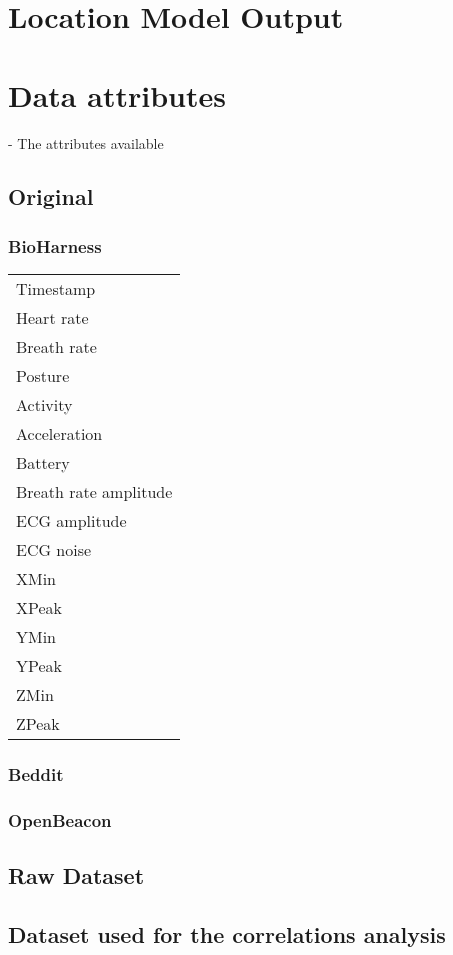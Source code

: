 \lstset{
	numberstyle=\tiny,
	frame=tb,
	basicstyle=\small,
	tabsize=1,
}

\begin{appendices}
	\section{Location Model Output}
		

	\section{Data attributes}
		- The attributes available
		\subsection{Original}
			\subsubsection{BioHarness}
			\begin{tabular}{l}
				Timestamp \\
				Heart rate \\
				Breath rate \\
				Posture \\
				Activity \\
				Acceleration \\
				Battery \\
				Breath rate amplitude \\
				ECG amplitude \\
				ECG noise \\
				XMin \\
				XPeak \\
				YMin \\
				YPeak \\
				ZMin \\
				ZPeak \\
			\end{tabular}
			\subsubsection{Beddit}
			\subsubsection{OpenBeacon}
		\subsection{Raw Dataset}
			
		\subsection{Dataset used for the correlations analysis}

			
		
\end{appendices}
